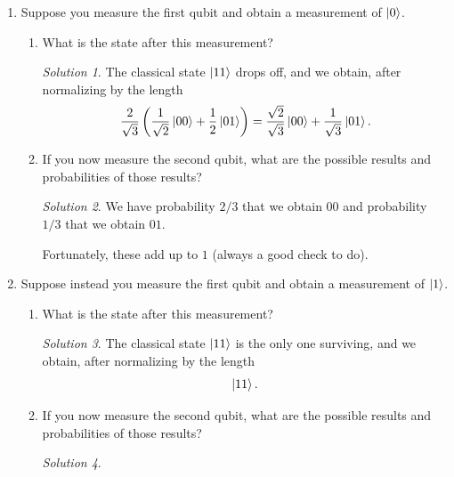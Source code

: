 \documentclass{article}
\theoremstyle{plain}
\theoremstyle{definition}
\theoremstyle{remark}
\newtheorem*{solution}{Solution}
\numberwithin{theorem}{section}
\begin{document}
\begin{enumerate}
	\item Suppose you measure the first qubit and obtain a measurement of $\ket{0}$.  
		\begin{enumerate}
			\item What is the state after this measurement?
				\vspace{1em}

				\begin{solution}

				The classical state $\ket{11}$ drops off, and we obtain, after normalizing by the length
				\[
					\frac{2}{\sqrt{3}} \left(	\frac{1}{\sqrt{2}}\ket{00} + \frac{1}{2}\ket{01} \right)
					=
					\frac{\sqrt{2}}{\sqrt{3}}\ket{00} + \frac{1}{\sqrt{3}}\ket{01}.
				\]
				\end{solution}


			\item If you now measure the second qubit, what are the possible results and probabilities of those results?
				\vspace{1em}

				\begin{solution}

				We have probability $2/3$ that we obtain $00$ and probability $1/3$ that we obtain $01$.

				Fortunately, these add up to $1$ (always a good check to do).
				\end{solution}

		\end{enumerate}
	\item Suppose instead you measure the first qubit and obtain a measurement of $\ket{1}$.
		\begin{enumerate}
			\item What is the state after this measurement?
				\vspace{1em}

				\begin{solution}

				The classical state $\ket{11}$ is the only one surviving, and we obtain, after normalizing by the length
				\[
					\ket{11}.
				\]
				\end{solution}


			\item If you now measure the second qubit, what are the possible results and probabilities of those results?
				\vspace{1em}

				\begin{solution}


\end{solution}
\end{enumerate}
\end{enumerate}
\end{document}
